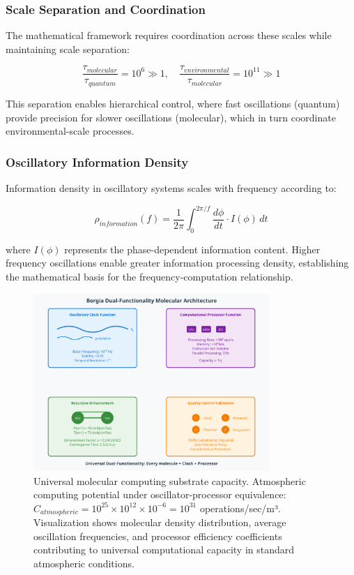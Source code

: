\documentclass[12pt,a4paper]{article}
\begin{document}
\subsubsection{Scale Separation and Coordination}

The mathematical framework requires coordination across these scales while maintaining scale separation:

\begin{equation}
\frac{\tau_{molecular}}{\tau_{quantum}} = 10^{6} \gg 1, \quad \frac{\tau_{environmental}}{\tau_{molecular}} = 10^{11} \gg 1
\end{equation}

This separation enables hierarchical control, where fast oscillations (quantum) provide precision for slower oscillations (molecular), which in turn coordinate environmental-scale processes.

\subsubsection{Oscillatory Information Density}

Information density in oscillatory systems scales with frequency according to:

\begin{equation}
\rho_{information}(f) = \frac{1}{2\pi} \int_0^{2\pi/f} \frac{d\phi}{dt} \cdot I(\phi) \, dt
\end{equation}

where $I(\phi)$ represents the phase-dependent information content. Higher frequency oscillations enable greater information processing density, establishing the mathematical basis for the frequency-computation relationship.

\begin{figure}[H]
    \centering
    \includegraphics[width=0.8\textwidth]{images/molecular-information-storage-mechanisms.pdf}
    \caption{Universal molecular computing substrate capacity. Atmospheric computing potential under oscillator-processor equivalence: $C_{atmospheric} = 10^{25} \times 10^{12} \times 10^{-6} = 10^{31}$ operations/sec/m³. Visualization shows molecular density distribution, average oscillation frequencies, and processor efficiency coefficients contributing to universal computational capacity in standard atmospheric conditions.}
    \label{fig:universal_computing}
    \end{figure}
\end{document}
